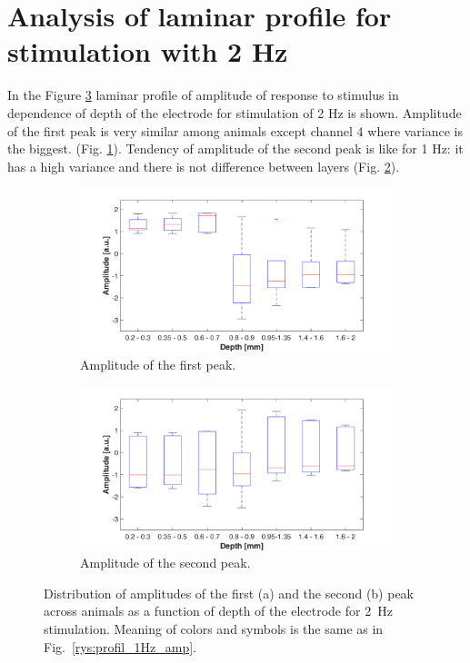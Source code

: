 \documentclass{pracalicmgr}
\begin{document}
 
 \section{Analysis of laminar profile for stimulation with 2 Hz}
  
    In the Figure \ref{rys:profil_2Hz_amp} laminar profile of amplitude of response to stimulus in dependence of depth of the electrode for stimulation of 2 Hz is shown. Amplitude of the first peak is very similar among animals except channel 4 where variance is the biggest. (Fig. \ref{rys:profil_2Hz_amp1}). Tendency of amplitude of the second peak is like for 1 Hz: it has a high variance and there is not difference between layers (Fig. \ref{rys:profil_2Hz_amp2}).
  
 	\begin{figure}[H]
 	\begin{subfigure}{.5\textwidth}
 		\centering
 		\includegraphics[width=1.\linewidth]{profile_2Hz_amp.png}
 		\caption{Amplitude of the first peak.}
 		\label{rys:profil_2Hz_amp1}
 	\end{subfigure}%
 	\begin{subfigure}{.5\textwidth}
 		\centering
 		\includegraphics[width=1.\linewidth]{profile_2Hz_amp2.png}
 		\caption{Amplitude of the second peak.}
 		\label{rys:profil_2Hz_amp2}
 	\end{subfigure}
 	
 	\caption{Distribution of amplitudes of the first (a) and the second (b) peak across animals as a function of depth of the electrode for 2~Hz stimulation. Meaning of colors and symbols is the same as in Fig.~\ref{rys:profil_1Hz_amp}.}
 	\label{rys:profil_2Hz_amp}
 \end{figure}
\end{document}
